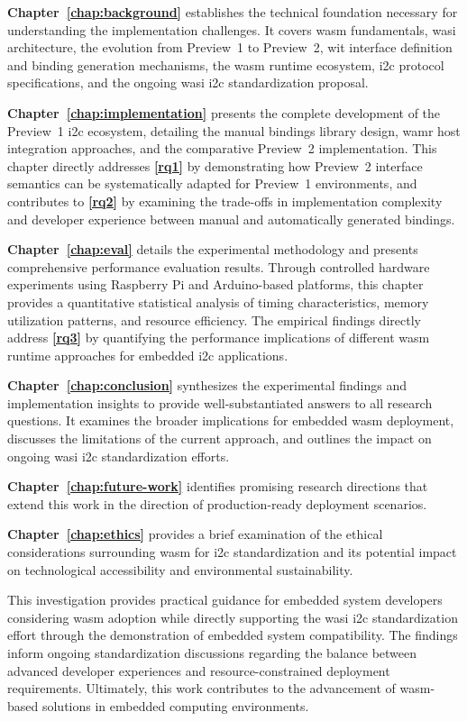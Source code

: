 \textbf{Chapter~\ref{chap:background}} establishes the technical foundation necessary for understanding the implementation challenges. It covers \acrshort{wasm} fundamentals, \acrshort{wasi} architecture, the evolution from Preview~1 to Preview~2, \acrshort{wit} interface definition and binding generation mechanisms, the \acrshort{wasm} runtime ecosystem, \acrshort{i2c} protocol specifications, and the ongoing \acrshort{wasi} \acrshort{i2c} standardization proposal.

\textbf{Chapter~\ref{chap:implementation}} presents the complete development of the Preview~1 \acrshort{i2c} ecosystem, detailing the manual bindings library design, \acrshort{wamr} host integration approaches, and the comparative Preview~2 implementation. This chapter directly addresses \textbf{\autoref{rq1}} by demonstrating how Preview~2 interface semantics can be systematically adapted for Preview~1 environments, and contributes to \textbf{\autoref{rq2}} by examining the trade-offs in implementation complexity and developer experience between manual and automatically generated bindings.

\textbf{Chapter~\ref{chap:eval}} details the experimental methodology and presents comprehensive performance evaluation results. Through controlled hardware experiments using Raspberry Pi and Arduino-based platforms, this chapter provides a quantitative statistical analysis of timing characteristics, memory utilization patterns, and resource efficiency. The empirical findings directly address \textbf{\autoref{rq3}} by quantifying the performance implications of different \acrshort{wasm} runtime approaches for embedded \acrshort{i2c} applications.

\textbf{Chapter~\ref{chap:conclusion}} synthesizes the experimental findings and implementation insights to provide well-substantiated answers to all research questions. It examines the broader implications for embedded \acrshort{wasm} deployment, discusses the limitations of the current approach, and outlines the impact on ongoing \acrshort{wasi} \acrshort{i2c} standardization efforts.


\textbf{Chapter~\ref{chap:future-work}} identifies promising research directions that extend this work in the direction of production-ready deployment scenarios.

\textbf{Chapter~\ref{chap:ethics}} provides a brief examination of the ethical considerations surrounding \acrshort{wasm} for \acrshort{i2c} standardization and its potential impact on technological accessibility and environmental sustainability.

This investigation provides practical guidance for embedded system developers considering \acrshort{wasm} adoption while directly supporting the \acrshort{wasi} \acrshort{i2c} standardization effort through the demonstration of embedded system compatibility. The findings inform ongoing standardization discussions regarding the balance between advanced developer experiences and resource-constrained deployment requirements. Ultimately, this work contributes to the advancement of \acrshort{wasm}-based solutions in embedded computing environments.
